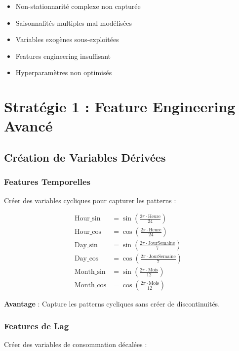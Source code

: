 \documentclass[12pt,a4paper]{article}
\begin{document}
\begin{itemize}
    \item Non-stationnarité complexe non capturée
    \item Saisonnalités multiples mal modélisées
    \item Variables exogènes sous-exploitées
    \item Features engineering insuffisant
    \item Hyperparamètres non optimisés
\end{itemize}

\section{Stratégie 1 : Feature Engineering Avancé}

\subsection{Création de Variables Dérivées}

\subsubsection{Features Temporelles}

Créer des variables cycliques pour capturer les patterns :

\begin{align}
    \text{Hour\_sin} &= \sin\left(\frac{2\pi \cdot \text{Heure}}{24}\right) \\
    \text{Hour\_cos} &= \cos\left(\frac{2\pi \cdot \text{Heure}}{24}\right) \\
    \text{Day\_sin} &= \sin\left(\frac{2\pi \cdot \text{JourSemaine}}{7}\right) \\
    \text{Day\_cos} &= \cos\left(\frac{2\pi \cdot \text{JourSemaine}}{7}\right) \\
    \text{Month\_sin} &= \sin\left(\frac{2\pi \cdot \text{Mois}}{12}\right) \\
    \text{Month\_cos} &= \cos\left(\frac{2\pi \cdot \text{Mois}}{12}\right)
\end{align}

\textbf{Avantage} : Capture les patterns cycliques sans créer de discontinuités.

\subsubsection{Features de Lag}

Créer des variables de consommation décalées :
\end{document}
